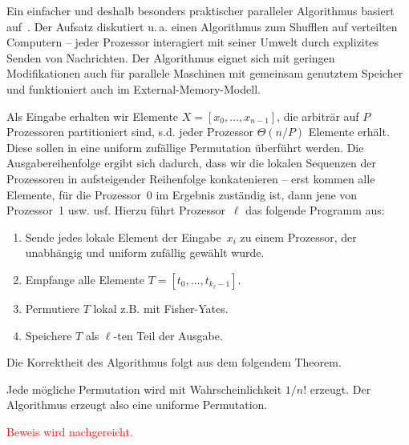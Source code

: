Ein einfacher und deshalb besonders praktischer paralleler Algorithmus basiert auf~\cite{SANDERS2016489}.
Der Aufsatz diskutiert u.\,a. einen Algorithmus zum Shufflen auf verteilten Computern --
jeder Prozessor interagiert mit seiner Umwelt durch explizites Senden von Nachrichten.
Der Algorithmus eignet sich mit geringen Modifikationen auch für parallele Maschinen mit gemeinsam genutztem Speicher und funktioniert auch im External-Memory-Modell.

Als Eingabe erhalten wir Elemente $X=[x_0, \ldots, x_{n-1}]$, die arbiträr auf $P$ Prozessoren partitioniert sind, s.d. jeder Prozessor $\Theta(n/P)$ Elemente erhält.
Diese sollen in eine uniform zufällige Permutation überführt werden.
Die Ausgabereihenfolge ergibt sich dadurch, dass wir die lokalen Sequenzen der Prozessoren in aufsteigender Reihenfolge konkatenieren --
erst kommen alle Elemente, für die Prozessor~0 im Ergebnis zuständig ist, dann jene von Prozessor~1 usw. usf.
Hierzu führt Prozessor~$\ell$ das folgende Programm aus:

\begin{enumerate}
    \item Sende jedes lokale Element der Eingabe~$x_i$ zu einem Prozessor, der unabhängig und uniform zufällig gewählt wurde.
    \item Empfange alle Elemente $T = [t_0, \ldots, t_{k_\ell-1}]$.
          \iffalse\item Berechne die Präfixsumme $\Delta_\ell = \sum_{i=0}^{\ell - 1} k_i$.
          Der Wert $\Delta_\ell$ entspricht dann der Position des ersten Elements von Prozessor~$\ell$ in der Ausgabe.\fi
    \item Permutiere $T$ lokal z.B. mit Fisher-Yates.
    \item Speichere $T$ als $\ell$-ten Teil der Ausgabe.
\end{enumerate}

Die Korrektheit des Algorithmus folgt aus dem folgendem Theorem.

\begin{theorem}
    Jede mögliche Permutation wird mit Wahrscheinlichkeit $1/n!$ erzeugt.
    Der Algorithmus erzeugt also eine uniforme Permutation.
\end{theorem}

\noindent
\textcolor{red}{Beweis wird nachgereicht.}

